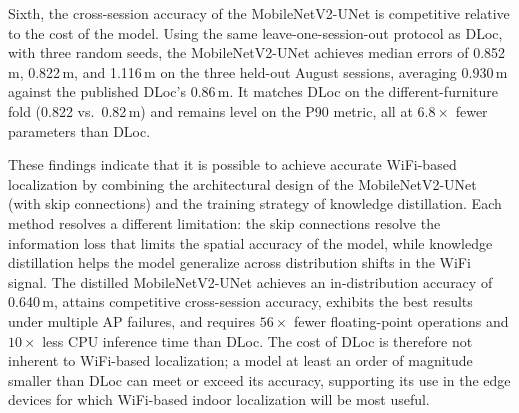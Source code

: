 Sixth, the cross-session accuracy of the MobileNetV2-UNet is competitive relative to the cost of the
model. Using the same leave-one-session-out protocol as DLoc, with three random seeds, the
MobileNetV2-UNet achieves median errors of 0.852\,m, 0.822\,m, and 1.116\,m on the three held-out August
sessions, averaging 0.930\,m against the published DLoc's 0.86\,m. It matches DLoc on the
different-furniture fold (0.822 vs.\ 0.82\,m) and remains level on the P90 metric, all at $6.8\times$
fewer parameters than DLoc.

These findings indicate that it is possible to achieve accurate WiFi-based localization by combining the
architectural design of the MobileNetV2-UNet (with skip connections) and the training strategy of
knowledge distillation. Each method resolves a different limitation: the skip connections resolve the
information loss that limits the spatial accuracy of the model, while knowledge distillation helps the
model generalize across distribution shifts in the WiFi signal. The distilled MobileNetV2-UNet achieves
an in-distribution accuracy of 0.640\,m, attains competitive cross-session accuracy, exhibits the best
results under multiple AP failures, and requires $56\times$ fewer floating-point operations and
$10\times$ less CPU inference time than DLoc. The cost of DLoc is therefore not inherent to WiFi-based
localization; a model at least an order of magnitude smaller than DLoc can meet or exceed its accuracy,
supporting its use in the edge devices for which WiFi-based indoor localization will be most useful.

